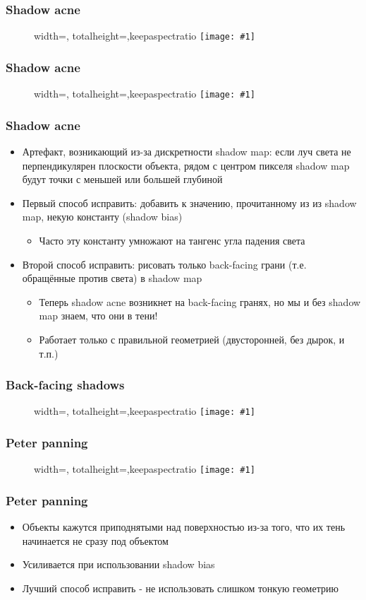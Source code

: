 \documentclass{beamer}
\newcommand{\slideimage}[1]{
  \begin{figure}
    \begin{adjustbox}{width=\textwidth, totalheight=\textheight-2\baselineskip-2\baselineskip,keepaspectratio}
      \texttt{[image: \#1]}
    \end{adjustbox}
  \end{figure}
}
\begin{document}
\begin{frame}[fragile]
\frametitle{Shadow acne}
\slideimage{shadow-acne.png}
\end{frame}

\begin{frame}[fragile]
\frametitle{Shadow acne}
\slideimage{shadow-acne-scheme.png}
\end{frame}

\begin{frame}[fragile]
\frametitle{Shadow acne}
\begin{itemize}
\item Артефакт, возникающий из-за дискретности shadow map: если луч света не перпендикулярен плоскости объекта, рядом с центром пикселя shadow map будут точки с меньшей или большей глубиной
\pause
\item Первый способ исправить: добавить к значению, прочитанному из из shadow map, некую константу (shadow bias)
\begin{itemize}
\item Часто эту константу умножают на тангенс угла падения света
\end{itemize}
\pause
\item Второй способ исправить: рисовать только back-facing грани (т.е. обращённые против света) в shadow map
\begin{itemize}
\item Теперь shadow acne возникнет на back-facing гранях, но мы и без shadow map знаем, что они в тени!
\item Работает только с правильной геометрией (двусторонней, без дырок, и т.п.)
\end{itemize}
\end{itemize}
\end{frame}

\begin{frame}[fragile]
\frametitle{Back-facing shadows}
\slideimage{shadow-mapping-backface.png}
\end{frame}

\begin{frame}[fragile]
\frametitle{Peter panning}
\slideimage{peter-panning.png}
\end{frame}

\begin{frame}[fragile]
\frametitle{Peter panning}
\begin{itemize}
\item Объекты кажутся приподнятыми над поверхностью из-за того, что их тень начинается не сразу под объектом
\pause
\item Усиливается при использовании shadow bias
\pause
\item Лучший способ исправить - не использовать слишком тонкую геометрию
\end{itemize}
\end{frame}
\end{document}
